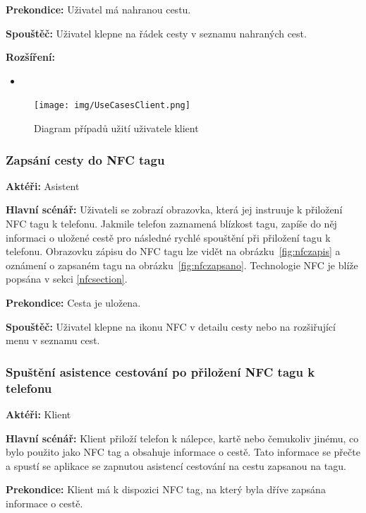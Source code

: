 \documentclass[czech,master,public,dept460,male,java,cpdeclaration]{diploma}
\newcommand{\usecase}[2]{\subsubsection{#1}\label{#2}}
\begin{document}
\vspace{0.1cm}
\noindent
\textbf{Prekondice:} Uživatel má nahranou cestu.

\vspace{0.1cm}
\noindent
\textbf{Spouštěč:} Uživatel klepne na řádek cesty v seznamu nahraných cest.

\vspace{0.1cm}
\noindent
\textbf{Rozšíření:}
\begin{itemize}
  \item {}
\end{itemize}

\begin{figure}[H]
        \centering
                \texttt{[image: img/UseCasesClient.png]}
        \caption{Diagram případů užití uživatele klient}
        \label{fig:UseCasesClient}
\end{figure}


\usecase{Zapsání cesty do NFC tagu} {nfczapis}
\textbf{Aktéři:} Asistent

\vspace{0.1cm}
\noindent
\textbf{Hlavní scénář:} Uživateli se zobrazí
obrazovka, která jej instruuje k přiložení NFC tagu k telefonu. Jakmile telefon zaznamená blízkost tagu,
zapíše do něj informaci o uložené cestě pro následné rychlé spouštění při přiložení tagu k telefonu.
Obrazovku zápisu do NFC tagu lze vidět na obrázku~\ref{fig:nfczapis} a oznámení o zapsaném tagu
na obrázku~\ref{fig:nfczapsano}. Technologie NFC je blíže popsána v sekci \ref{nfcsection}.

\vspace{0.1cm}
\noindent
\textbf{Prekondice:} Cesta je uložena.

\vspace{0.1cm}
\noindent
\textbf{Spouštěč:} Uživatel klepne na ikonu NFC v detailu cesty nebo na rozšiřující menu v seznamu cest.


\usecase{Spuštění asistence cestování po přiložení NFC tagu k telefonu}{prilozeninfc}
\textbf{Aktéři:} Klient

\vspace{0.1cm}
\noindent
\textbf{Hlavní scénář:} Klient přiloží telefon k nálepce, kartě nebo čemukoliv jinému, co bylo použito
jako NFC tag a obsahuje informace o cestě. Tato informace se přečte a spustí se aplikace se zapnutou
asistencí cestování na cestu zapsanou na tagu.

\vspace{0.1cm}
\noindent
\textbf{Prekondice:} Klient má k dispozici NFC tag, na který byla dříve zapsána informace o cestě.
\end{document}
